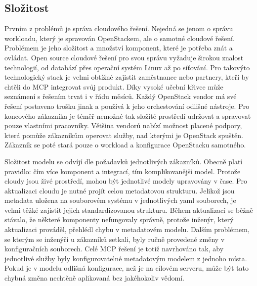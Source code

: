 \subsection{Složitost}
Prvním z problémů je správa cloudového řešení. Nejedná se jenom o správu workloadu, který je spravován OpenStackem, ale o samotné cloudové řešení. Problémem je jeho složitost a množství komponent, které je potřeba znát a ovládat. Open source cloudové řešení pro svou správu vyžaduje širokou znalost technologií, od databází přes operační systém Linux až po síťování. Pro takovýto technologický stack je velmi obtížné zajistit zaměstnance nebo partnery, kteří by chtěli do MCP integrovat svůj produkt. Díky vysoké učební křivce může seznámení s řešením trvat i v řádu měsíců. Každý OpenStack vendor má své řešení postaveno trošku jinak a používá k jeho orchestování odlišné nástroje. Pro koncového zákazníka je téměř nemožné tak složité prostředí udržovat a spravovat pouze vlastními pracovníky. Většina vendorů nabízí možnost placené podpory, která pomůže zákazníkům operovat služby, nad kterými je OpenStack spuštěn. Zákazník se poté stará pouze o workload a konfigurace OpenStacku samotného.

Složitost modelu se odvíjí dle požadavků jednotlivých zákazníků. Obecně platí pravidlo: čím více komponent a integrací, tím komplikovanější model. Protože cloudy jsou živé prostředí, mohou být jednotlivé modely upravovány v čase. Pro aktualizaci cloudu je nutné projít celou metadatovou strukturu. Jelikož jsou metadata uložena na souborovém systému v jednotlivých yaml souborech, je velmi těžké zajistit jejich standardizovanou strukturu. Během aktualizací se běžně stávalo, že některé komponenty nefungovaly správně, protože inženýr, který aktualizaci prováděl, přehlédl chybu v metadatovém modelu. Dalším problémem, se kterým se inženýři u zákazníků setkali, byly ručně provedené změny v konfiguračních souborech. Celé MCP řešení je totiž navrhováno tak, aby jednotlivé služby byly konfigurovatelné metadatovým modelem z jednoho místa. Pokud je v modelu odlišná konfigurace, než je na cílovém serveru, může být tato chybná změna nechtěně aplikovaná bez jakéhokoliv vědomí.

